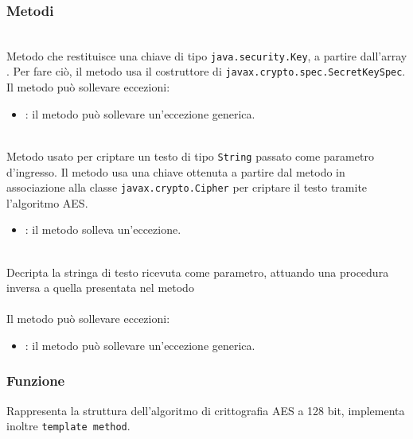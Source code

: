 \subsubsection*{Metodi}
\begin{description}
	\item{}\\
	Metodo che restituisce una chiave di tipo \texttt{java.security.Key}, a partire dall'array . Per fare ciò, il metodo usa il costruttore di \texttt{javax.crypto.spec.SecretKeySpec}.
	Il metodo può sollevare eccezioni:
	\begin{itemize}
		\item {}: il metodo può sollevare un'eccezione generica.
	\end{itemize}
	\item{}\\
	Metodo usato per criptare un testo di tipo \texttt{String} passato come parametro d'ingresso. Il metodo usa una chiave ottenuta a partire dal metodo  in associazione alla classe \texttt{javax.crypto.Cipher} per criptare il testo tramite l'algoritmo AES.
	\begin{itemize}
		\item {}: il metodo solleva un'eccezione.
	\end{itemize}
	\item{}\\
	Decripta la stringa di testo ricevuta come parametro, attuando una procedura inversa a quella presentata nel metodo \\\\
	Il metodo può sollevare eccezioni:
	\begin{itemize}
		\item {}: il metodo può sollevare un'eccezione generica.
	\end{itemize}
\end{description}


\subsubsection*{Funzione}
Rappresenta la struttura dell'algoritmo di crittografia AES a 128 bit, implementa inoltre \texttt{template method}.

